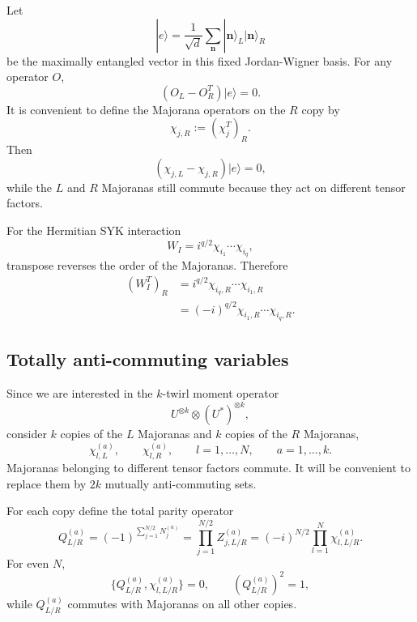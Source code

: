 \documentclass{article}
\theoremstyle{definition}
\begin{document}
Let
\begin{equation}
    |e\rangle
    =
    \frac{1}{\sqrt d}
    \sum_{\mathbf n}
    |\mathbf n\rangle_L|\mathbf n\rangle_R
\end{equation}
be the maximally entangled vector in this fixed Jordan-Wigner basis.
For any operator $O$,
\begin{equation}
    (O_L-O_R^T)|e\rangle=0.
    \label{eq:SYK_general_mirror}
\end{equation}
It is convenient to define the Majorana operators on the $R$ copy by
\begin{equation}
    \chi_{j,R}
    :=
    (\chi_j^T)_R.
    \label{eq:SYK_R_majorana}
\end{equation}
Then
\begin{equation}
    (\chi_{j,L}-\chi_{j,R})|e\rangle=0,
\end{equation}
while the $L$ and $R$ Majoranas still commute because they act on
different tensor factors.

For the Hermitian SYK interaction
\begin{equation}
    W_I
    =
    i^{q/2}
    \chi_{i_1}\cdots\chi_{i_q},
\end{equation}
transpose reverses the order of the Majoranas.  Therefore
\begin{align}
    (W_I^T)_R
    &=
    i^{q/2}
    \chi_{i_q,R}\cdots\chi_{i_1,R}
    \nonumber\\
    &=
    (-i)^{q/2}
    \chi_{i_1,R}\cdots\chi_{i_q,R}.
    \label{eq:SYK_W_transpose}
\end{align}


\subsection{Totally anti-commuting variables}

Since we are interested in the $k$-twirl moment operator
\begin{equation}
    U^{\otimes k}\otimes(U^*)^{\otimes k},
\end{equation}
consider $k$ copies of the $L$ Majoranas and $k$ copies of the $R$
Majoranas,
\begin{equation}
    \chi_{l,L}^{(a)},
    \qquad
    \chi_{l,R}^{(a)},
    \qquad
    l=1,\ldots,N,
    \qquad
    a=1,\ldots,k.
\end{equation}
Majoranas belonging to different tensor factors commute.  It will be
convenient to replace them by $2k$ mutually anti-commuting sets.

For each copy define the total parity operator
\begin{equation}
    Q_{L/R}^{(a)}
    =
    (-1)^{
       \sum_{j=1}^{N/2}N_j^{(a)}
    }
    =
    \prod_{j=1}^{N/2}
    Z_{j,L/R}^{(a)}
    =
    (-i)^{N/2}
    \prod_{l=1}^N
    \chi_{l,L/R}^{(a)}.
    \label{eq:SYK_copy_parity}
\end{equation}
For even $N$,
\begin{equation}
    \{
       Q_{L/R}^{(a)},
       \chi_{l,L/R}^{(a)}
    \}
    =
    0,
    \qquad
    (Q_{L/R}^{(a)})^2=1,
\end{equation}
while $Q_{L/R}^{(a)}$ commutes with Majoranas on all other copies.
\end{document}
